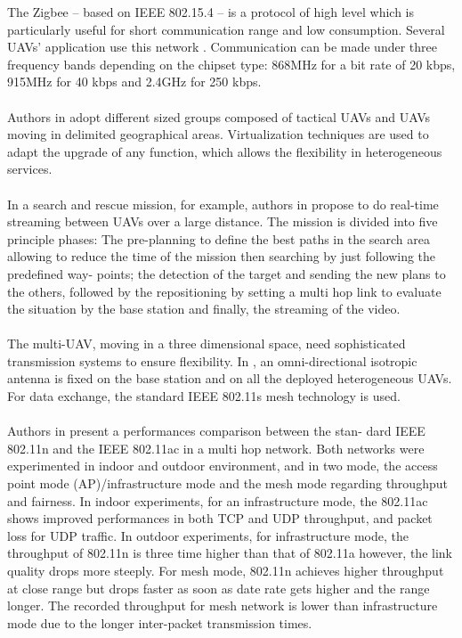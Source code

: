 \documentclass[11pt,openany]{book}
\begin{document}
\begin{algorimth}[H]
The Zigbee – based on IEEE 802.15.4 – is a protocol of high level which is particularly useful for short communication range and low consumption. Several UAVs’ application use this network \cite{asadpour2014routing}. Communication can be made under three frequency bands depending on the chipset type: 868MHz for a bit rate of 20 kbps, 915MHz for 40 kbps and 2.4GHz for 250 kbps.\\\\
Authors in \cite{vidal2015multi} adopt diﬀerent sized groups composed of tactical UAVs and UAVs moving in delimited geographical areas. Virtualization techniques are used to adapt the upgrade of any function, which allows the ﬂexibility in heterogeneous services.\\\\
In a search and rescue mission, for example, authors in \cite{scherer2015autonomous} propose to do real-time streaming between UAVs over a large distance. The mission is divided into ﬁve principle phases: The pre-planning to deﬁne the best paths in the search area allowing to reduce the time of the mission then searching by just following the predeﬁned way- points; the detection of the target and sending the new plans to the others, followed by the repositioning by setting a multi hop link to evaluate the situation by the base station and ﬁnally, the streaming of the video.\\\\
The multi-UAV, moving in a three dimensional space, need sophisticated transmission systems to ensure ﬂexibility. In \cite{scherer2015autonomous}, an omni-directional isotropic antenna is ﬁxed on the base station and on all the deployed heterogeneous UAVs. For data exchange, the standard IEEE 802.11s mesh technology is used.\\\\
Authors in \cite{hayat2015experimental} present a performances comparison between the stan- dard IEEE 802.11n and the IEEE 802.11ac in a multi hop network. Both networks were experimented in indoor and outdoor environment, and in two mode, the access point mode (AP)/infrastructure mode and the mesh mode regarding throughput and fairness. In indoor experiments, for an infrastructure mode, the 802.11ac shows improved performances in both TCP and UDP throughput, and packet loss for UDP traﬃc. In outdoor experiments, for infrastructure mode, the throughput of 802.11n is three time higher than that of 802.11a however, the link quality drops more steeply. For mesh mode, 802.11n achieves higher throughput at close range but drops faster as soon as date rate gets higher and the range longer. The recorded throughput for mesh network is lower than infrastructure mode due to the longer inter-packet transmission times.\\\\

\end{algorimth}
\end{document}
